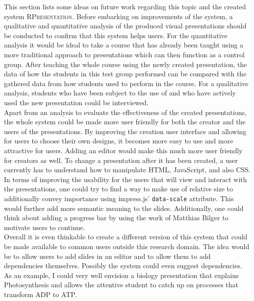 \documentclass[twoside, 12pt]{article}
\newcommand{\sys}{\textsc{RPresentation}\xspace}
\begin{document}
This section lists some ideas on future work regarding this topic and the created system \sys. Before embarking on improvements of the system, a qualitative and quantitative analysis of the produced visual presentations should be conducted to confirm that this system helps users. For the quantitative analysis it would be ideal to take a course that has already been taught using a more traditional approach to presentations which can then function as a control group. After teaching the whole course using the newly created presentation, the data of how the students in this test group performed can be compared with the gathered data from how students used to perform in the course. For a qualitative analysis, students who have been subject to the use of and who have actively used the new presentation could be interviewed.\\

Apart from an analysis to evaluate the effectiveness of the created presentations, the whole system could be made more user friendly for both the creator and the users of the presentations. By improving the creation user interface and allowing for users to choose their own designs, it becomes more easy to use and more attractive for users. Adding an editor would make this much more user friendly for creators as well. To change a presentation after it has been created, a user currently has to understand how to manipulate HTML, JavaScript, and also CSS.\\

In terms of improving the usability for the users that will view and interact with the presentations, one could try to find a way to make use of relative size to additionally convey importance using impress.js' \texttt{data-scale} attribute. This would further add more semantic meaning to the slides. Additionally, one could think about adding a progress bar by using the work of Matthias Bilger \cite{bilger:npentrel15} to motivate users to continue.\\

Overall it is even thinkable to create a different version of this system that could be made available to common users outside this research domain. The idea would be to allow users to add slides in an editor and to allow them to add dependencies themselves. Possibly the system could even suggest dependencies. As an example, I could very well envision a biology presentation that explains Photosynthesis and allows the attentive student to catch up on processes that transform ADP to ATP.\\
\end{document}
